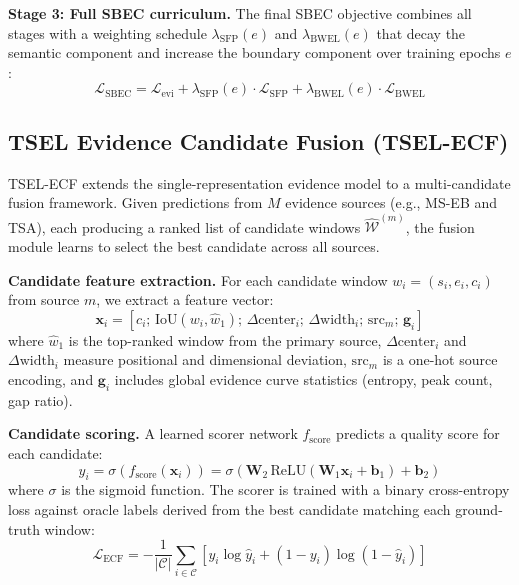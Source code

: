 \documentclass[conference]{IEEEtran}
\begin{document}
\textbf{Stage 3: Full SBEC curriculum.}  The final SBEC objective combines all
stages with a weighting schedule \(\lambda_{\text{SFP}}(e)\) and
\(\lambda_{\text{BWEL}}(e)\) that decay the semantic component and increase the
boundary component over training epochs \(e\):
\begin{equation}
\label{eq:sbec_loss}
\mathcal{L}_{\text{SBEC}} = \mathcal{L}_{\text{evi}} + \lambda_{\text{SFP}}(e)
\cdot \mathcal{L}_{\text{SFP}} + \lambda_{\text{BWEL}}(e) \cdot
\mathcal{L}_{\text{BWEL}}
\end{equation}

\subsection{TSEL Evidence Candidate Fusion (TSEL-ECF)}
\label{sec:ecf}

TSEL-ECF extends the single-representation evidence model to a multi-candidate
fusion framework.  Given predictions from \(M\) evidence sources (e.g., MS-EB
and TSA), each producing a ranked list of candidate windows
\(\hat{\mathcal{W}}^{(m)}\), the fusion module learns to select the best
candidate across all sources.

\textbf{Candidate feature extraction.}  For each candidate window \(w_i =
(s_i, e_i, c_i)\) from source \(m\), we extract a feature vector:
\begin{equation}
\label{eq:cand_feat}
\mathbf{x}_i = [c_i; \, \text{IoU}(w_i, \hat{w}_1); \, \Delta\text{center}_i;
\, \Delta\text{width}_i; \, \text{src}_m; \, \mathbf{g}_i]
\end{equation}
where \(\hat{w}_1\) is the top-ranked window from the primary source,
\(\Delta\text{center}_i\) and \(\Delta\text{width}_i\) measure positional and
dimensional deviation, \(\text{src}_m\) is a one-hot source encoding, and
\(\mathbf{g}_i\) includes global evidence curve statistics (entropy, peak count,
gap ratio).

\textbf{Candidate scoring.}  A learned scorer network \(f_{\text{score}}\)
predicts a quality score for each candidate:
\begin{equation}
\label{eq:score}
\hat{y}_i = \sigma(f_{\text{score}}(\mathbf{x}_i)) = \sigma(\mathbf{W}_2
\, \text{ReLU}(\mathbf{W}_1 \mathbf{x}_i + \mathbf{b}_1) + \mathbf{b}_2)
\end{equation}
where \(\sigma\) is the sigmoid function.  The scorer is trained with a binary
cross-entropy loss against oracle labels derived from the best candidate
matching each ground-truth window:
\begin{equation}
\label{eq:ecf_loss}
\mathcal{L}_{\text{ECF}} = -\frac{1}{|\mathcal{C}|} \sum_{i \in \mathcal{C}}
\left[ y_i \log \hat{y}_i + (1 - y_i) \log(1 - \hat{y}_i) \right]
\end{equation}
\end{document}
